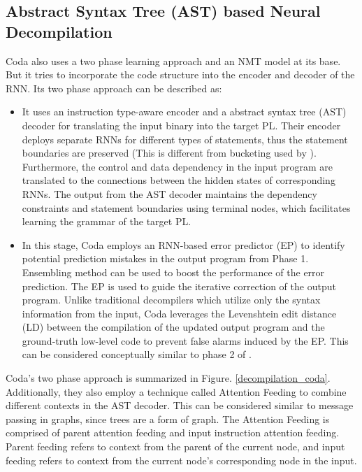 \documentclass{article}
\begin{document}
\subsection{Abstract Syntax Tree (AST) based Neural Decompilation}
Coda \cite{coda} also uses a two phase learning approach and an NMT model at its base. But it tries to incorporate the code structure into the encoder and decoder of the RNN. Its two phase approach can be described as:
\begin{itemize}
    \item It uses an instruction type-aware encoder and a abstract syntax tree (AST) decoder
for translating the input binary into the target PL. Their encoder deploys separate RNNs for different
types of statements, thus the statement boundaries are preserved (This is different from bucketing used by \citet{katz2019towards}). Furthermore, the control and data dependency in the input program are translated to the connections between the hidden states of corresponding RNNs. The output from the AST decoder maintains the dependency constraints and statement boundaries using terminal nodes, which facilitates learning the grammar of the target PL.
    
    \item In this stage, Coda employs an RNN-based error predictor (EP) to identify potential
prediction mistakes in the output program from Phase 1. Ensembling method can be used to boost
the performance of the error prediction. The EP is used to guide the iterative correction of the output
program. Unlike traditional decompilers which utilize only the syntax information from the input,
Coda leverages the Levenshtein edit distance (LD) between the compilation of the updated output
program and the ground-truth low-level code to prevent false alarms induced by the EP. This can be considered conceptually similar to phase 2 of \citet{katz2019towards}.

\end{itemize}

Coda's two phase approach is summarized in Figure. \ref{decompilation_coda}. Additionally, they also employ a technique called Attention Feeding to combine different contexts in the AST decoder. This can be considered similar to message passing in graphs, since trees are a form of graph. The Attention Feeding is comprised of parent attention feeding and input instruction attention feeding. Parent feeding refers to context from the parent of the current node, and input feeding refers to context from the current node's corresponding node in the input. 
\end{document}
